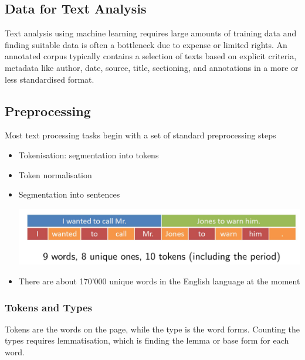 \documentclass[11pt]{article}
\begin{document}
\subsection{Data for Text Analysis}
Text analysis using machine learning requires large amounts of training data and finding suitable data is often a bottleneck due to expense or limited rights. An annotated corpus typically contains a selection of texts based on explicit criteria, metadata like author, date, source, title, sectioning, and annotations in a more or less standardised format.

\subsection{Preprocessing}
Most text processing tasks begin with a set of standard preprocessing steps
\begin{itemize}
	\item Tokenisation: segmentation into tokens
	\item Token normalisation
	\item Segmentation into sentences
	\begin{center}
		\includegraphics[width=0.8\linewidth]{img/sentence_segmentation}
	\end{center}
	\item There are about 170'000 unique words in the English language at the moment
\end{itemize}

\subsubsection{Tokens and Types}
Tokens are the words on the page, while the type is the word forms. Counting the types requires lemmatisation, which is finding the lemma or base form for each word.
\end{document}
